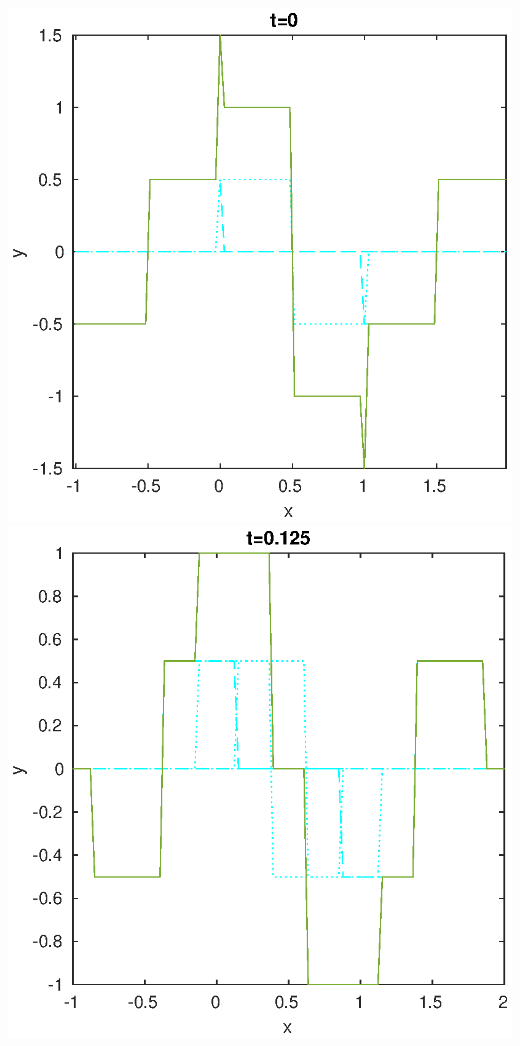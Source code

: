 \documentclass{jreport}
\begin{document}
\includegraphics[scale=0.3]{20.eps}
\includegraphics[scale=0.3]{2125.eps}
\end{document}
